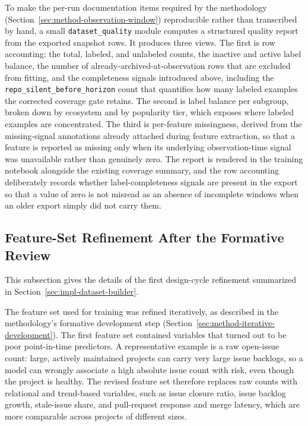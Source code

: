 To make the per-run documentation items required by the methodology (Section~\ref{sec:method-observation-window}) reproducible rather than transcribed by hand, a small \texttt{dataset\_quality} module computes a structured quality report from the exported snapshot rows. It produces three views. The first is row accounting: the total, labeled, and unlabeled counts, the inactive and active label balance, the number of already-archived-at-observation rows that are excluded from fitting, and the completeness signals introduced above, including the \texttt{repo\_silent\_before\_horizon} count that quantifies how many labeled examples the corrected coverage gate retains. The second is label balance per subgroup, broken down by ecosystem and by popularity tier, which exposes where labeled examples are concentrated. The third is per-feature missingness, derived from the missing-signal annotations already attached during feature extraction, so that a feature is reported as missing only when its underlying observation-time signal was unavailable rather than genuinely zero. The report is rendered in the training notebook alongside the existing coverage summary, and the row accounting deliberately records whether label-completeness signals are present in the export so that a value of zero is not misread as an absence of incomplete windows when an older export simply did not carry them.

\subsection{Feature-Set Refinement After the Formative Review}
\label{sec:impl-feature-refinement}

This subsection gives the details of the first design-cycle refinement summarized in Section~\ref{sec:impl-dataset-builder}.

The feature set used for training was refined iteratively, as described in the methodology's formative development step (Section~\ref{sec:method-iterative-development}). The first feature set contained variables that turned out to be poor point-in-time predictors. A representative example is a raw open-issue count: large, actively maintained projects can carry very large issue backlogs, so a model can wrongly associate a high absolute issue count with risk, even though the project is healthy. The revised feature set therefore replaces raw counts with relational and trend-based variables, such as issue closure ratio, issue backlog growth, stale-issue share, and pull-request response and merge latency, which are more comparable across projects of different sizes.

